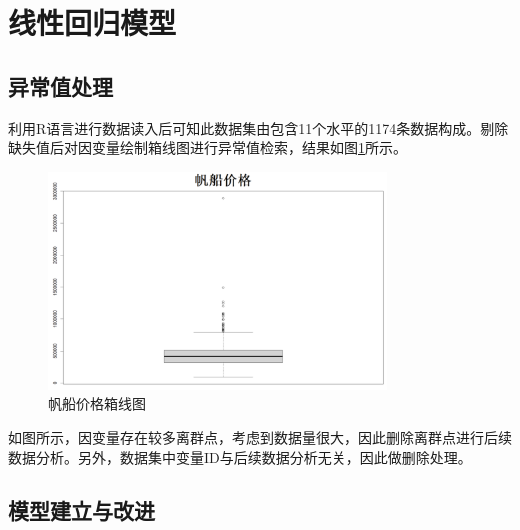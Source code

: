 \documentclass[a4paper,12pt,onecolumn,oneside]{article}
\begin{document}
	\section{线性回归模型}
	\subsection{异常值处理}
	利用R语言进行数据读入后可知此数据集由包含11个水平的1174条数据构成。剔除缺失值后对因变量绘制箱线图进行异常值检索，结果如图\ref{fig:tu21}所示。\par 
	\begin{figure}[h]
		\centering
		\includegraphics[width=0.8\textwidth]{res/tu21.png}
		\caption{帆船价格箱线图}
		\label{fig:tu21}
	\end{figure}
	如图所示，因变量存在较多离群点，考虑到数据量很大，因此删除离群点进行后续数据分析。另外，数据集中变量ID与后续数据分析无关，因此做删除处理。

	\subsection{模型建立与改进}
\end{document}

